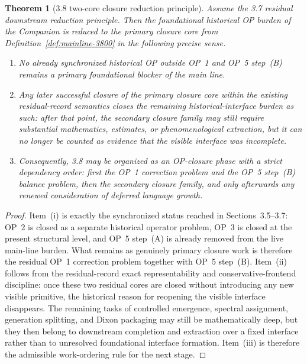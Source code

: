 \documentclass[12pt,a4paper]{article}
\newtheorem{theorem}{Theorem}[section]
\begin{document}
\begin{theorem}[3.8 two-core closure reduction principle]
\label{thm:mainline-3800}
Assume the 3.7 residual downstream reduction principle. Then the foundational historical OP burden of the Companion is reduced to the primary closure core from Definition~\ref{def:mainline-3800} in the following precise sense.
\begin{enumerate}[label=(\roman*), leftmargin=2em]
 \item No already synchronized historical OP outside OP~1 and OP~5 step~(B) remains a primary foundational blocker of the main line.
 \item Any later successful closure of the primary closure core within the existing residual-record semantics closes the remaining historical-interface burden \emph{as such}: after that point, the secondary closure family may still require substantial mathematics, estimates, or phenomenological extraction, but it can no longer be counted as evidence that the visible interface was incomplete.
 \item Consequently, 3.8 may be organized as an OP-closure phase with a strict dependency order: first the OP~1 correction problem and the OP~5 step~(B) balance problem, then the secondary closure family, and only afterwards any renewed consideration of deferred language growth.
\end{enumerate}
\end{theorem}

\begin{proof}
Item~(i) is exactly the synchronized status reached in Sections~3.5--3.7: OP~2 is closed as a separate historical operator problem, OP~3 is closed at the present structural level, and OP~5 step~(A) is already removed from the live main-line burden. What remains as genuinely primary closure work is therefore the residual OP~1 correction problem together with OP~5 step~(B). Item~(ii) follows from the residual-record exact representability and conservative-frontend discipline: once these two residual cores are closed without introducing any new visible primitive, the historical reason for reopening the visible interface disappears. The remaining tasks of controlled emergence, spectral assignment, generation splitting, and Dixon packaging may still be mathematically deep, but they then belong to downstream completion and extraction over a fixed interface rather than to unresolved foundational interface formation. Item~(iii) is therefore the admissible work-ordering rule for the next stage.
\end{proof}
\end{document}
